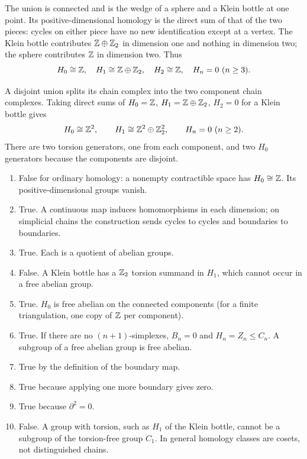 The union is connected and is the wedge of a sphere and a Klein bottle at one point. Its positive-dimensional homology is the direct sum of that of the two pieces: cycles on either piece have no new identification except at a vertex.
The Klein bottle contributes $\mathbb{Z}\oplus\mathbb{Z}_2$ in dimension one and nothing in dimension two; the sphere contributes $\mathbb{Z}$ in dimension two. Thus
\[
H_0\cong\mathbb{Z},\quad H_1\cong\mathbb{Z}\oplus\mathbb{Z}_2,\quad
H_2\cong\mathbb{Z},\quad H_n=0\ (n\ge3).
\]

A disjoint union splits its chain complex into the two component chain complexes. Taking direct sums of $H_0=\mathbb{Z}$, $H_1=\mathbb{Z}\oplus\mathbb{Z}_2$, $H_2=0$ for a Klein bottle gives
\[
H_0\cong\mathbb{Z}^2,\qquad H_1\cong\mathbb{Z}^2\oplus\mathbb{Z}_2^2,
\qquad H_n=0\ (n\ge2).
\]
There are two torsion generators, one from each component, and two $H_0$ generators because the components are disjoint.

\begin{enumerate}[label=\textbf{(\alph*)}]
\item False for ordinary homology: a nonempty contractible space has $H_0\cong\mathbb{Z}$. Its positive-dimensional groups vanish.
\item True. A continuous map induces homomorphisms in each dimension; on simplicial chains the construction sends cycles to cycles and boundaries to boundaries.
\item True. Each is a quotient of abelian groups.
\item False. A Klein bottle has a $\mathbb{Z}_2$ torsion summand in $H_1$, which cannot occur in a free abelian group.
\item True. $H_0$ is free abelian on the connected components (for a finite triangulation, one copy of $\mathbb{Z}$ per component).
\item True. If there are no $(n+1)$-simplexes, $B_n=0$ and $H_n=Z_n\le C_n$. A subgroup of a free abelian group is free abelian.
\item True by the definition of the boundary map.
\item True because applying one more boundary gives zero.
\item True because $\partial^2=0$.
\item False. A group with torsion, such as $H_1$ of the Klein bottle, cannot be a subgroup of the torsion-free group $C_1$. In general homology classes are cosets, not distinguished chains.
\end{enumerate}

